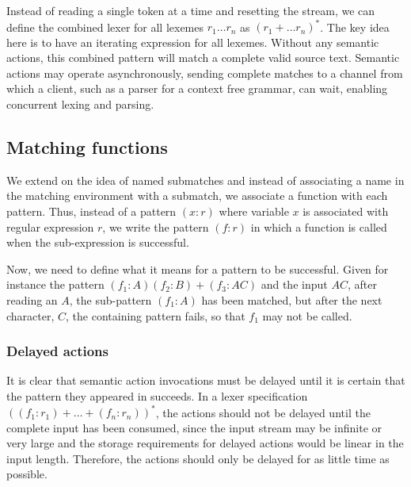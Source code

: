 Instead of reading a single token at a time and resetting the stream, we can
define the combined lexer for all lexemes $r_1 \dots r_n$ as $(r_1 + \dots
r_n)^*$. The key idea here is to have an iterating expression for all lexemes.
Without any semantic actions, this combined pattern will match a complete valid
source text. Semantic actions may operate asynchronously, sending complete
matches to a channel from which a client, such as a parser for a context free
grammar, can wait, enabling concurrent lexing and parsing.


\subsection{Matching functions}

We extend on the idea of named submatches and instead of associating a name in
the matching environment with a submatch, we associate a function with each
pattern. Thus, instead of a pattern $(x:r)$ where variable $x$ is associated
with regular expression $r$, we write the pattern $(f:r)$ in which a function is
called when the sub-expression is successful.

Now, we need to define what it means for a pattern to be successful. Given for
instance the pattern $(f_1:A)(f_2:B)+(f_3:AC)$ and the input $AC$, after reading
an $A$, the sub-pattern $(f_1:A)$ has been matched, but after the next
character, $C$, the containing pattern fails, so that $f_1$ may not be called.

\subsubsection{Delayed actions}

It is clear that semantic action invocations must be delayed until it is certain
that the pattern they appeared in succeeds. In a lexer specification $((f_1:r_1)
+ \dots + (f_n:r_n))^*$, the actions should not be delayed until the complete
input has been consumed, since the input stream may be infinite or very large
and the storage requirements for delayed actions would be linear in the input
length. Therefore, the actions should only be delayed for as little time as
possible.

